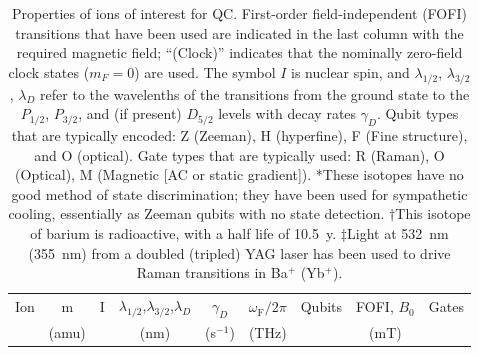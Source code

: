 \documentclass[%
reprint,
 amsmath,amssymb,
]{revtex4-1}
\begin{document}
\begin{table}[t b h !]
\caption{Properties of ions of interest for QC.  First-order field-independent (FOFI) transitions that have been used are indicated in the last column with the required magnetic field; ``(Clock)'' indicates that the nominally zero-field clock states ($m_F=0$) are used.  The symbol $I$ is nuclear spin, and $\lambda_{1/2}$, $\lambda_{3/2}$, $\lambda_{D}$ refer to the wavelenths of the transitions from the ground state to the $P_{1/2}$, $P_{3/2}$, and (if present) $D_{5/2}$ levels with decay rates $\gamma_{D}$.  Qubit types that are typically encoded:  Z (Zeeman), H (hyperfine), F (Fine structure), and O (optical).  Gate types that are typically used:  R (Raman), O (Optical), M (Magnetic [AC or static gradient]).  *These isotopes have no good method of state discrimination; they have been used for sympathetic cooling, essentially as Zeeman qubits with no state detection.  $\dagger$This isotope of barium is radioactive, with a half life of 10.5~y. $\ddagger$Light at 532~nm (355~nm) from a doubled (tripled) YAG laser has been used to drive Raman transitions in Ba$^{+}$ (Yb$^{+}$).}
\begin{ruledtabular}
\begin{tabular}{ccccccccc}

Ion  & m  & I & $\lambda_{1/2}$,$\lambda_{3/2}$,$\lambda_{D}$  & $\gamma_{D}$ & $\omega_{\textrm{F}}/2\pi$  & Qubits  & FOFI, $B_0$ & Gates \\
  & (amu) &  &  (nm)  &  (s$^{-1}$)  & (THz)  &     & (mT) &  \\
\hline


\end{tabular}
\end{ruledtabular}
\end{table}
\end{document}
